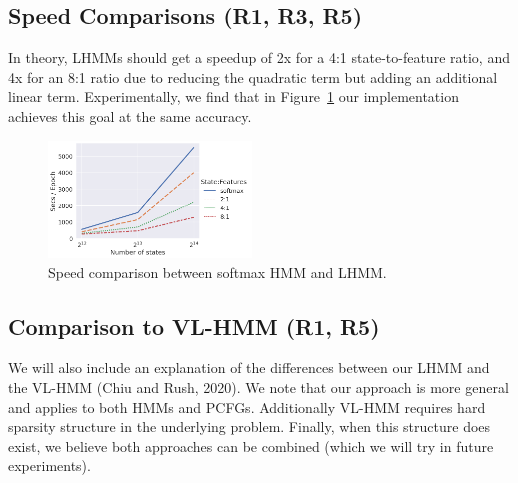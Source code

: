 \documentclass{article}
\begin{document}
\subsection{Speed Comparisons (R1, R3, R5)}
In theory, LHMMs should get a speedup of 2x for a 4:1 state-to-feature ratio, and 4x for an 8:1 ratio due to reducing the quadratic term but adding an additional linear term. Experimentally, we find that in Figure~\ref{fig:speed} our implementation achieves this goal at the same accuracy. 

\begin{figure}[!htp]
  \centering
  \vspace*{-0.3cm}
  \includegraphics[width=0.48\textwidth]{imgs/hmm/lhmm-states-features-speed.png}
  \vspace*{-0.8cm}
  \caption{\label{fig:speed}
  Speed comparison between softmax HMM and LHMM. 
  }
\end{figure}

\vspace{-0.2cm}
\subsection{Comparison to VL-HMM (R1, R5)}
We will also include an explanation of the differences between our LHMM and the VL-HMM (Chiu and Rush, 2020). We note that 
our approach is more general and applies to both HMMs and PCFGs.
Additionally VL-HMM requires hard sparsity structure in the underlying problem. Finally, when this structure does exist,  
we believe both approaches can be combined (which we will try in future experiments).

\vspace{-0.2cm}
\end{document}
